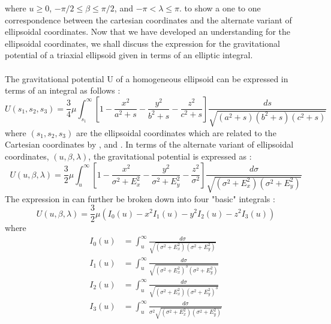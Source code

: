 %
where $u \geq 0$, $-\pi/2 \leq \beta \leq \pi/2$, and $-\pi < \lambda \leq \pi$.  to  show a one to one correspondence between the cartesian coordinates and the alternate variant of ellipsoidal coordinates. Now that we have developed an understanding for the ellipsoidal coordinates, we shall discuss the expression for the gravitational potential of a triaxial ellipsoid given in terms of an elliptic integral.
\\\\
The gravitational potential U of a homogeneous ellipsoid can be expressed in terms of an integral as follows \cite{elliptic_integral}:
\begin{equation}
\label{elliptic_pot}
U(s_1, s_2, s_3) = \frac{3}{4} \mu \int_{s_1}^{\infty} \left[1 - \frac{x^2}{a^2+s} - \frac{y^2}{b^2+s} - \frac{z^2}{c^2+s} \right] \frac{ds}{\sqrt{(a^2+s)(b^2+s)(c^2+s)}}
\end{equation}
%
where $(s_1, s_2, s_3)$ are the ellipsoidal coordinates which are related to the Cartesian coordinates by ,  and . In terms of the alternate variant of ellipsoidal coordinates, $(u, \beta, \lambda)$, the gravitational potential is expressed as \cite{elliptic_integral}:
\begin{equation}
\label{elliptic_altpot}
U(u,\beta,\lambda) = \frac{3}{2} \mu \int_{u}^{\infty} \left[1 - \frac{x^2}{\sigma^2+E_x^2} - \frac{y^2}{\sigma^2+E_y^2} - \frac{z^2}{\sigma^2} \right] \frac{d\sigma}{\sqrt{(\sigma^2+E_x^2)(\sigma^2+E_y^2)}}
\end{equation}
%
The expression in  can further be broken down into four "basic" integrals \cite{elliptic_integral}:
\begin{equation}
\label{elliptic_altpot_expand}
U(u,\beta,\lambda) = \frac{3}{2} \mu (I_0(u) - x^2I_1(u) - y^2I_2(u) - z^2I_3(u))
\end{equation}
%
where
\begin{align}
\label{I0}
I_0(u) &= \int_u^{\infty} \frac{d\sigma}{\sqrt{(\sigma^2+E_x^2)(\sigma^2+E_y^2)}} \\
\label{I1}
I_1(u) &= \int_u^{\infty} \frac{d\sigma}{\sqrt{(\sigma^2+E_x^2)^3(\sigma^2+E_y^2)}} \\
\label{I2}
I_2(u) &= \int_u^{\infty} \frac{d\sigma}{\sqrt{(\sigma^2+E_x^2)(\sigma^2+E_y^2)^3}} \\
\label{I3}
I_3(u) &= \int_u^{\infty} \frac{d\sigma}{\sigma^2 \sqrt{(\sigma^2+E_x^2)(\sigma^2+E_y^2)}}
\end{align}
%
